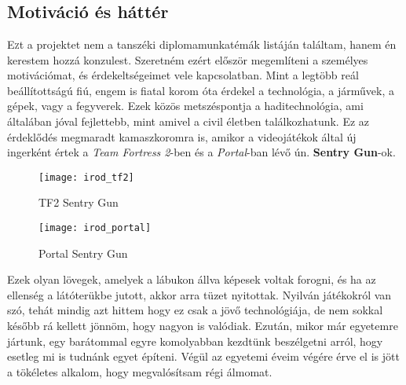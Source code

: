 \chapter{\bevezetes}

\section{Motiváció és háttér}

\lettrine{E}zt a projektet nem a tanszéki diplomamunkatémák listáján találtam, hanem én kerestem hozzá konzulest. Szeretném ezért először megemlíteni a személyes motivációmat, és érdekeltségeimet vele kapcsolatban. Mint a legtöbb reál beállítottságú fiú, engem is fiatal korom óta érdekel a technológia, a járművek, a gépek, vagy a fegyverek. Ezek közös metszéspontja a haditechnológia, ami általában jóval fejlettebb, mint amivel a civil életben találkozhatunk. Ez az érdeklődés megmaradt kamaszkoromra is, amikor a videojátékok által új ingerként értek a \textsl{Team Fortress 2}-ben és a \textsl{Portal}-ban lévő ún. \textbf{Sentry Gun}-ok. \\[5mm]



\begin{figure}[h!]
	\centering
	\begin{minipage}{.5\textwidth}
		\centering
		\texttt{[image: irod\_tf2]} 
		\caption{TF2 Sentry Gun \cite{tf2}}
		\label{fig:irod_tf2}
	\end{minipage}%
	\begin{minipage}{.5\textwidth}
		\centering
		\texttt{[image: irod\_portal]} 
		\caption{Portal Sentry Gun \cite{portal}}
		\label{fig:irod_portal}
	\end{minipage}
\end{figure}

Ezek olyan lövegek, amelyek a lábukon állva képesek voltak forogni, és ha az ellenség a látóterükbe jutott, akkor arra tüzet nyitottak. Nyilván játékokról van szó, tehát mindig azt hittem hogy ez csak a jövő technológiája, de nem sokkal később rá kellett jönnöm, hogy nagyon is valódiak. Ezután, mikor már egyetemre jártunk, egy barátommal egyre komolyabban kezdtünk beszélgetni arról, hogy esetleg mi is tudnánk egyet építeni. Végül az egyetemi éveim végére érve el is jött a tökéletes alkalom, hogy megvalósítsam régi álmomat. \\

